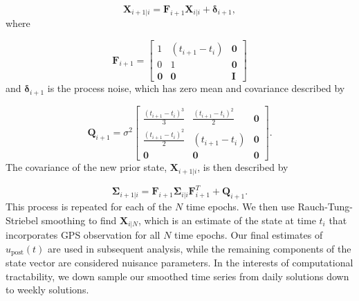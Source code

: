 \documentclass[draft,linenumbers]{AGUJournal}
\begin{document}
\begin{equation}\label{predict}
  \mathbf{X}_{i+1|i} = \mathbf{F}_{i+1}\mathbf{X}_{i|i} + \mathbf{\delta}_{i+1}, 
\end{equation}
where 

\begin{equation}
  \mathbf{F}_{i+1} = 
  \left[
  \begin{array}{ccc}
    1           & (t_{i+1} - t_i) & \mathbf{0}\\
    0           & 1              & \mathbf{0}\\
    \mathbf{0}  & \mathbf{0}     & \mathbf{I}
  \end{array}
  \right]
\end{equation}
and $\mathbf{\delta}_{i+1}$ is the process noise, which has zero mean and covariance described by

\begin{equation}
  \mathbf{Q}_{i+1} = 
  \sigma^2 \left[
  \begin{array}{ccc}
  \frac{(t_{i+1} - t_i)^3}{3} & \frac{(t_{i+1} - t_{i})^2}{2} & \mathbf{0}\\
  \frac{(t_{i+1} - t_i)^2}{2} & (t_{i+1} - t_{i}) & \mathbf{0}\\ 
  \mathbf{0} & \mathbf{0} & \mathbf{0}
  \end{array}
  \right].
\end{equation}
The covariance of the new prior state, $\mathbf{X}_{i+1|i}$, is then described by

\begin{equation}
  \mathbf{\Sigma}_{i+1|i} = \mathbf{F}_{i+1}\mathbf{\Sigma}_{i|i}\mathbf{F}^T_{i+1} + \mathbf{Q}_{i+1}.
\end{equation}
This process is repeated for each of the $N$ time epochs.  We then use Rauch-Tung-Striebel smoothing \citep{Rauch1965} to find $\mathbf{X}_{i|N}$, which is an estimate of the state at time $t_i$ that incorporates GPS observation for all $N$ time epochs.  Our final estimates of $u_\mathrm{post}(t)$ are used in subsequent analysis, while the remaining components of the state vector are considered nuisance parameters. In the interests of computational tractability, we down sample our smoothed time series from daily solutions down to weekly solutions.
\end{document}
